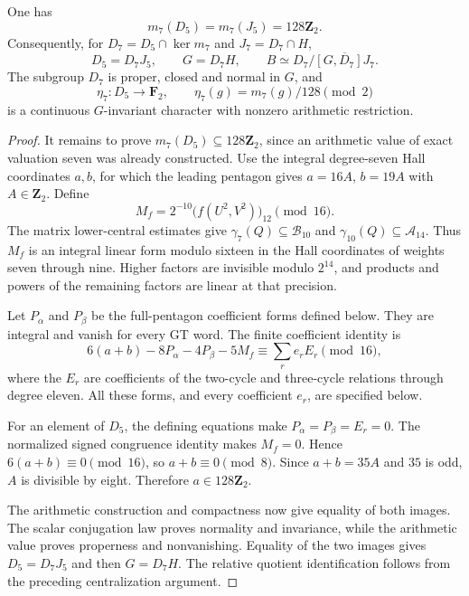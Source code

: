 \begin{theorem}\label{thm:weight-seven-exact-image}
One has
\[
 m_7(D_5)=m_7(J_5)=128\mathbf Z_2.
\]
Consequently, for $D_7=D_5\cap\ker m_7$ and $J_7=D_7\cap H$,
\[
 D_5=D_7J_5,\qquad G=D_7H,\qquad
 B\simeq D_7/\overline{[G,D_7]J_7}.
\]
The subgroup $D_7$ is proper, closed and normal in $G$, and
\[
 \eta_7:D_5\longrightarrow\mathbf F_2,
 \qquad \eta_7(g)=m_7(g)/128\pmod2
\]
is a continuous $G$-invariant character with nonzero arithmetic
restriction.
\end{theorem}

\begin{proof}
It remains to prove $m_7(D_5)\subseteq128\mathbf Z_2$, since an
arithmetic value of exact valuation seven was already constructed.
Use the integral degree-seven Hall coordinates $a,b$, for which
the leading pentagon gives $a=16A$, $b=19A$ with $A\in\mathbf Z_2$.
Define
\[
 M_f=2^{-10}\bigl(f(U^2,V^2)\bigr)_{12}\pmod{16}.
\]
The matrix lower-central estimates give
$\gamma_7(Q)\subseteq\mathcal B_{10}$ and
$\gamma_{10}(Q)\subseteq\mathcal A_{14}$.
Thus $M_f$ is an integral linear form modulo sixteen in the Hall
coordinates of weights seven through nine. Higher factors are
invisible modulo $2^{14}$, and products and powers of the remaining
factors are linear at that precision.

Let $P_\alpha$ and $P_\beta$ be the full-pentagon coefficient forms
defined below. They are integral and vanish for every GT
word. The finite coefficient identity is
\begin{equation}\label{eq:weight-seven-upper128-certificate}
 6(a+b)-8P_\alpha-4P_\beta-5M_f
       \equiv\sum_r e_rE_r\pmod{16},
\end{equation}
where the $E_r$ are coefficients of the two-cycle and three-cycle
relations through degree eleven. All these forms, and every
coefficient $e_r$, are specified below.

For an element of $D_5$, the defining equations make
$P_\alpha=P_\beta=E_r=0$. The normalized signed congruence identity
makes $M_f=0$. Hence $6(a+b)\equiv0\pmod{16}$, so
$a+b\equiv0\pmod8$. Since $a+b=35A$ and $35$ is odd, $A$ is
divisible by eight. Therefore $a\in128\mathbf Z_2$.

The arithmetic construction and compactness now give equality of
both images. The scalar conjugation law proves normality and
invariance, while the arithmetic value proves properness and
nonvanishing. Equality of the two images gives $D_5=D_7J_5$ and
then $G=D_7H$. The relative quotient identification follows from
the preceding centralization argument.
\end{proof}

